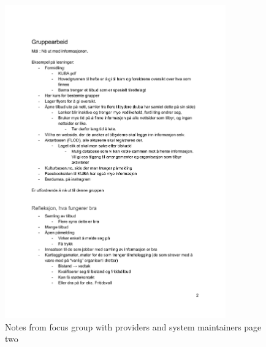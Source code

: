 \begin{figure}[H]
\centering
    \includegraphics[width=0.85\textwidth]{fig/workshop/providers/WSTilbydere_2.pdf}
    \caption{Notes from focus group with providers and system maintainers page two}
    \label{Provider_2}
\end{figure}

